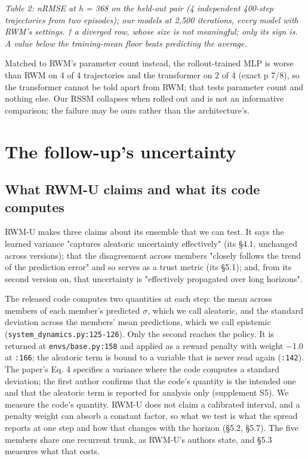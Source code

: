 \documentclass[10pt]{article}
\begin{document}
\emph{Table 2: nRMSE at h = 368 on the held-out pair (4 independent 400-step trajectories from two episodes); our models at 2,500 iterations, every model with RWM's settings. † a diverged row, whose size is not meaningful; only its sign is. A value below the training-mean floor beats predicting the average.}

Matched to RWM's parameter count instead, the rollout-trained MLP is worse than RWM on 4 of 4 trajectories and the transformer on 2 of 4 (exact p 7/8), so the transformer cannot be told apart from RWM; that tests parameter count and nothing else. Our RSSM collapses when rolled out and is not an informative comparison; the failure may be ours rather than the architecture's.


\section{The follow-up's uncertainty}

\subsection{What RWM-U claims and what its code computes}

RWM-U makes three claims about its ensemble that we can test. It says the learned variance "captures aleatoric uncertainty effectively" (its \S{}4.1, unchanged across versions); that the disagreement across members "closely follows the trend of the prediction error" and so serves as a trust metric (its \S{}5.1); and, from its second version on, that uncertainty is "effectively propagated over long horizons".

The released code computes two quantities at each step: the mean across members of each member's predicted $\sigma$, which we call aleatoric, and the standard deviation across the members' mean predictions, which we call epistemic (\texttt{system\_dynamics.py:125-126}). Only the second reaches the policy. It is returned at \texttt{envs/\allowbreak{}base\allowbreak{}.py:158} and applied as a reward penalty with weight $-$1.0 at \texttt{:166}; the aleatoric term is bound to a variable that is never read again (\texttt{:142}). The paper's Eq. 4 specifies a variance where the code computes a standard deviation; the first author confirms that the code's quantity is the intended one and that the aleatoric term is reported for analysis only (supplement S5). We measure the code's quantity. RWM-U does not claim a calibrated interval, and a penalty weight can absorb a constant factor, so what we test is what the spread reports at one step and how that changes with the horizon (\S{}5.2, \S{}5.7). The five members share one recurrent trunk, as RWM-U's authors state, and \S{}5.3 measures what that costs.
\end{document}
